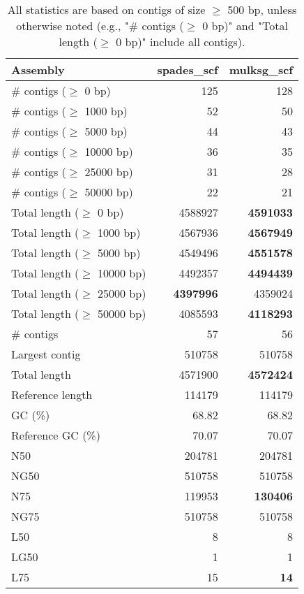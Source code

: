 \documentclass[12pt,a4paper]{article}
\begin{document}
\begin{table}[ht]
\begin{center}
\caption{All statistics are based on contigs of size $\geq$ 500 bp, unless otherwise noted (e.g., "\# contigs ($\geq$ 0 bp)" and "Total length ($\geq$ 0 bp)" include all contigs).}
\begin{tabular}{|l*{2}{|r}|}
\hline
Assembly & spades\_scf & mulksg\_scf \\ \hline
\# contigs ($\geq$ 0 bp) & 125 & 128 \\ \hline
\# contigs ($\geq$ 1000 bp) & 52 & 50 \\ \hline
\# contigs ($\geq$ 5000 bp) & 44 & 43 \\ \hline
\# contigs ($\geq$ 10000 bp) & 36 & 35 \\ \hline
\# contigs ($\geq$ 25000 bp) & 31 & 28 \\ \hline
\# contigs ($\geq$ 50000 bp) & 22 & 21 \\ \hline
Total length ($\geq$ 0 bp) & 4588927 & {\bf 4591033} \\ \hline
Total length ($\geq$ 1000 bp) & 4567936 & {\bf 4567949} \\ \hline
Total length ($\geq$ 5000 bp) & 4549496 & {\bf 4551578} \\ \hline
Total length ($\geq$ 10000 bp) & 4492357 & {\bf 4494439} \\ \hline
Total length ($\geq$ 25000 bp) & {\bf 4397996} & 4359024 \\ \hline
Total length ($\geq$ 50000 bp) & 4085593 & {\bf 4118293} \\ \hline
\# contigs & 57 & 56 \\ \hline
Largest contig & 510758 & 510758 \\ \hline
Total length & 4571900 & {\bf 4572424} \\ \hline
Reference length & 114179 & 114179 \\ \hline
GC (\%) & 68.82 & 68.82 \\ \hline
Reference GC (\%) & 70.07 & 70.07 \\ \hline
N50 & 204781 & 204781 \\ \hline
NG50 & 510758 & 510758 \\ \hline
N75 & 119953 & {\bf 130406} \\ \hline
NG75 & 510758 & 510758 \\ \hline
L50 & 8 & 8 \\ \hline
LG50 & 1 & 1 \\ \hline
L75 & 15 & {\bf 14} \\ \hline

\end{tabular}
\end{center}
\end{table}
\end{document}
